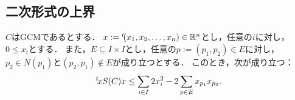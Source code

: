 \subsection{二次形式の上界}

\begin{lemma}
  \label{lem:symmMatrix_quadform_upper_bound}
  \leanok
  $C$はGCMであるとする．
  $x := {}^t\!(x_1, x_2, \ldots, x_n) \in \mathbb{R}^n$とし，任意の$i$に対し，$0 \le x_i$とする．
  また，$E \subseteq I \times I$とし，任意の$p := (p_1, p_2) \in E$に対し，$p_2 \in N(p_1)$と$(p_2, p_1) \notin E$が成り立つとする．
  このとき，次が成り立つ：
  \begin{equation}
    {}^t\!x S(C) x
    \le \sum_{i \in I} 2 x_i ^ 2 - 2 \sum_{p \in E} x_{p_1} x_{p_2}.
  \end{equation}
\end{lemma}

